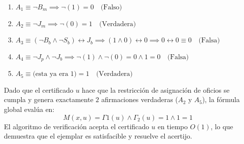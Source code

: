 \begin{enumerate}[label=\arabic*., leftmargin=*]
    \begin{enumerate}
        \item $A_1 \equiv \neg B_m \implies \neg(1) = 0 \quad \text{(Falso)}$
        \item $A_2 \equiv \neg J_m \implies \neg(0) = 1 \quad \text{(Verdadera)}$
        \item $A_3 \equiv (\neg B_b \wedge \neg S_b) \leftrightarrow J_b \implies (1 \wedge 0) \leftrightarrow 0 \implies 0 \leftrightarrow 0 \equiv 0 \quad \text{(Falsa)}$
        \item $A_4 \equiv \neg J_p \wedge \neg J_b \implies \neg(1) \wedge \neg(0) = 0 \wedge 1 = 0 \quad \text{(Falsa)}$
        \item $A_5 \equiv \text{(esta ya era 1)} = 1 \quad \text{(Verdadera)}$
    \end{enumerate}
    
    Dado que el certificado $u$ hace que la restricción de asignación de oficios se cumpla y genera exactamente $2$ afirmaciones verdaderas ($A_2$ y $A_5$), la fórmula global evalúa en:$$M(x, u) = \Gamma1(u) \wedge \Gamma_2(u) = 1 \wedge 1 = 1$$ El algoritmo de verificación acepta el certificado $u$ en tiempo $O(1)$, lo que demuestra que el ejemplar es satisfacible y resuelve el acertijo.
\end{enumerate}
